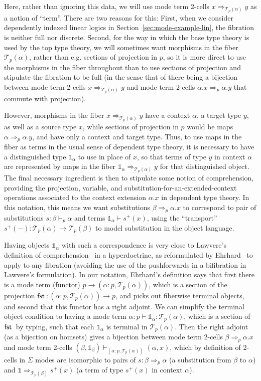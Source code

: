 \documentclass[10pt]{article}
\theoremstyle{definition}
\newcommand\dsd[1]{\ensuremath{\mathsf{#1}}}
\newcommand{\tcell}{\Rightarrow}
\newcommand{\app}[2]{\ensuremath{#1 \: #2}}
\newcommand{\sigmacl}[3]{\ensuremath{(#1{:}#2,#3)}}
\newcommand{\fst}[1]{\app{\dsd{fst}}{#1}}
\newcommand\TrPlus[2]{\ensuremath{{#1}^+(#2)}}
\newcommand\El[2]{\mathcal{T}_{#1}(#2)}
\newcommand\One{\ensuremath{\mathds{1}}}
\begin{document}
Here, rather than ignoring this data, we will use mode term 2-cells $x
\tcell_{\El p \alpha} y$ as a notion of ``term''.  There are two reasons
for this: First, when we consider dependently indexed linear logics in
Section~\ref{sec:mode-example-lin}, the fibration is neither full nor
discrete.  Second, for the way in which the base type theory is used by
the top type theory, we will sometimes want morphisms in the fiber
$\El{p}{\alpha}$, rather than e.g. sections of projection in $p$, so it
is more direct to use the morphisms in the fiber throughout than to use
sections of projection and stipulate the fibration to be full (in the
sense that of there being a bijection between mode term 2-cells $x
\tcell_{\El{p}{\alpha}} y$ and mode term 2-cells $\alpha.x \tcell_p
\alpha.y$ that commute with projection).

However, morphisms in the fiber $x \tcell_{\El p \alpha} y$ have a
context $\alpha$, a target type $y$, as well as a source type $x$, while
sections of projection in $p$ would be maps $\alpha \tcell_p \alpha.y$,
and have only a context and target type.  Thus, to use maps in the fiber
as terms in the usual sense of dependent type theory, it is necessary to
have a distinguished type $\One_\alpha$ to use in place of $x$, so that
terms of type $y$ in context $\alpha$ are represented by maps in the
fiber $\One_\alpha \tcell_{\El p \alpha} y$ for that distinguished
object.  The final necessary ingredient is then to stipulate some notion
of comprehension, providing the projection, variable, and
substitution-for-an-extended-context operations associated to the
context extension $\alpha.x$ in dependent type theory.  In this
notation, this means we want substitutions $\beta \tcell_p \alpha.x$ to
correspond to pair of substitutions $s : \beta \vdash_p \alpha$ and
terms $\One_\alpha \vdash \TrPlus{s}{x}$, using the ``transport''
$\TrPlus{s}{-} : \El{p}{\alpha} \to \El{p}{\beta}$ to model substitution
in the object language.

Having objects $\One_\alpha$ with such a correspondence is very close to
Lawvere's definition of comprehension~\citep{lawvere70comprehension} in
a hyperdoctrine, as reformulated by
Ehrhard~\citep{ehrhardXXcomprehension} to apply to any fibration
(avoiding the use of the pushforwards in a bifibration in Lawvere's
formulation).  In our notation, Ehrhard's definition says that first
there is a mode term (functor) $p \to
\sigmacl{\alpha}{p}{\El{p}{\alpha}}$, which is a section of the
projection $\fst : \sigmacl{\alpha}{p}{\El{p}{\alpha}} \to p$, and picks
out fiberwise terminal objects, and second that this functor has a right
adjoint.  We can simplify the terminal object condition to having a mode
term $\alpha : p \vdash \One_\alpha : \El{p} \alpha$, which is a section
of $\fst$ by typing, such that each $\One_\alpha$ is terminal in
$\El{p}{\alpha}$.  Then the right adjoint (as a bijection on homsets)
gives a bijection between mode term 2-cells $\beta \tcell_p \alpha.x$
and mode term 2-cells $(\beta,\One_\beta)
\vdash_{\sigmacl{\alpha}{p}{\El{p}{\alpha}}} (\alpha,x)$, which by
definition of 2-cells in $\Sigma$ modes are isomorphic to pairs of $s :
\beta \tcell_p \alpha$ (a substitution from $\beta$ to $\alpha$) and
$\One \tcell_{\El p \beta} \TrPlus{s}{x}$ (a term of type
$\TrPlus s x$ in
context $\alpha$).
\end{document}
